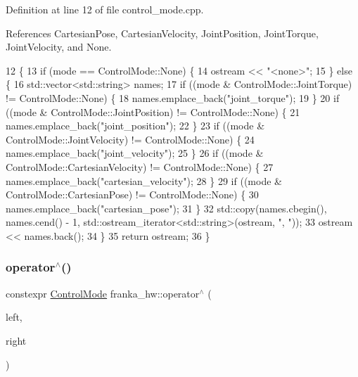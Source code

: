 Definition at line 12 of file control\+\_\+mode.\+cpp.



References Cartesian\+Pose, Cartesian\+Velocity, Joint\+Position, Joint\+Torque, Joint\+Velocity, and None.


\begin{DoxyCode}
12                                                               \{
13   \textcolor{keywordflow}{if} (mode == ControlMode::None) \{
14     ostream << \textcolor{stringliteral}{"<none>"};
15   \} \textcolor{keywordflow}{else} \{
16     std::vector<std::string> names;
17     \textcolor{keywordflow}{if} ((mode & ControlMode::JointTorque) != ControlMode::None) \{
18       names.emplace\_back(\textcolor{stringliteral}{"joint\_torque"});
19     \}
20     \textcolor{keywordflow}{if} ((mode & ControlMode::JointPosition) != ControlMode::None) \{
21       names.emplace\_back(\textcolor{stringliteral}{"joint\_position"});
22     \}
23     \textcolor{keywordflow}{if} ((mode & ControlMode::JointVelocity) != ControlMode::None) \{
24       names.emplace\_back(\textcolor{stringliteral}{"joint\_velocity"});
25     \}
26     \textcolor{keywordflow}{if} ((mode & ControlMode::CartesianVelocity) != ControlMode::None) \{
27       names.emplace\_back(\textcolor{stringliteral}{"cartesian\_velocity"});
28     \}
29     \textcolor{keywordflow}{if} ((mode & ControlMode::CartesianPose) != ControlMode::None) \{
30       names.emplace\_back(\textcolor{stringliteral}{"cartesian\_pose"});
31     \}
32     std::copy(names.cbegin(), names.cend() - 1, std::ostream\_iterator<std::string>(ostream, \textcolor{stringliteral}{", "}));
33     ostream << names.back();
34   \}
35   \textcolor{keywordflow}{return} ostream;
36 \}
\end{DoxyCode}
\mbox{\label{namespacefranka__hw_a8270a1f589cc045ec58e8b44e0f307f2}} 
\subsubsection{\texorpdfstring{operator$^\wedge$()}{operator^()}}
{\footnotesize\ttfamily constexpr \hyperlink{namespacefranka__hw_afa416558ce4baace5ac6c71bd5d2c98c}{Control\+Mode} franka\+\_\+hw\+::operator$^\wedge$ (\begin{DoxyParamCaption}\item[{\hyperlink{namespacefranka__hw_afa416558ce4baace5ac6c71bd5d2c98c}{Control\+Mode}}]{left,  }\item[{\hyperlink{namespacefranka__hw_afa416558ce4baace5ac6c71bd5d2c98c}{Control\+Mode}}]{right }\end{DoxyParamCaption})}



